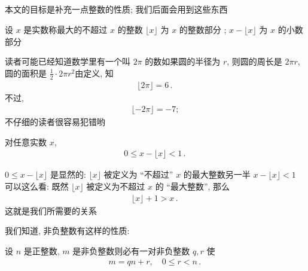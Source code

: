 \subsection*{\SomePropertiesOfIntegers}
\markright{\SomePropertiesOfIntegers}

本文的目标是补充一点整数的性质; 我们后面会用到这些东西\period

\begin{definition}
    设 $x$ 是实数\period 称最大的不超过 $x$ 的整数 $\lfloor x \rfloor$ 为 $x$ 的整数部分 ; $x - \lfloor x \rfloor$ 为 $x$ 的小数部分 \period
\end{definition}

\begin{example}
    读者可能已经知道数学里有一个叫 $2\pi$ 的数\period 如果圆的半径为 $r$, 则圆的周长是 $2\pi r$, 圆的面积是 $\frac12 \cdot 2\pi r^2$\period 由定义, 知
    \begin{align*}
        \lfloor 2\pi \rfloor = 6 \period
    \end{align*}
    不过,
    \begin{align*}
        \lfloor -2\pi \rfloor = -7;
    \end{align*}
    不仔细的读者很容易犯错哟\period
\end{example}

\begin{proposition}
    对任意实数 $x$,
    \begin{align*}
        0 \leq x - \lfloor x \rfloor < 1 \period
    \end{align*}
\end{proposition}

\begin{pf}
    $0 \leq x - \lfloor x \rfloor$ 是显然的: $\lfloor x \rfloor$ 被定义为 ``不超过'' $x$ 的最大整数\period 另一半 $x - \lfloor x \rfloor < 1$ 可以这么看: 既然 $\lfloor x \rfloor$ 被定义为不超过 $x$ 的 ``最大整数'', 那么
    \begin{align*}
        \lfloor x \rfloor + 1 > x \period
    \end{align*}
    这就是我们所需要的关系\period
\end{pf}

我们知道, 非负整数有这样的性质:

\begin{proposition}
    设 $n$ 是正整数, $m$ 是非负整数\period 则必有一对非负整数 $q,r$ 使
    \begin{align*}
        m = qn + r, \quad 0 \leq r < n \period
    \end{align*}
\end{proposition}

